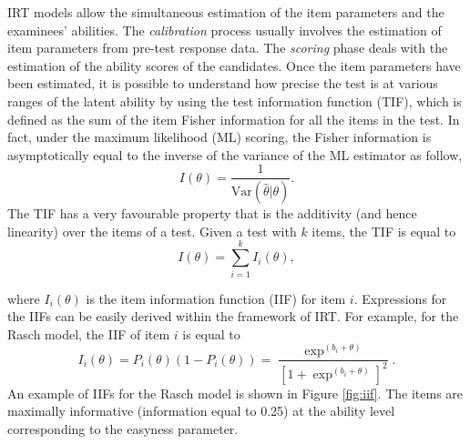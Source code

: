 IRT models allow the simultaneous estimation of the item parameters and the examinees' abilities. The \textit{calibration} process usually involves the estimation of item parameters from pre-test response data. The \textit{scoring} phase deals with the estimation of the ability scores of the candidates. Once the item parameters have been estimated, it is possible to understand how precise the test is at various ranges of the latent ability by using the test information function (TIF), which is defined as the sum of the item Fisher information for all the items in the test. In fact, under the maximum likelihood (ML) scoring, the Fisher information is asymptotically equal to the inverse of the variance of the ML estimator as follow,
\begin{equation}
I(\theta)=\frac{1}{\text{Var}(\hat{\theta}| \theta)}.
\end{equation}
The TIF has a very favourable property that is the additivity (and hence linearity) over the items of a test. Given a test with $k$ items, the TIF is equal to
\begin{equation}
I(\theta)=\sum_{i=1}^k{I_i(\theta)},
\end{equation}

\noindent where $I_i(\theta)$ is the item information function (IIF) for item $i$. Expressions for the IIFs can be easily derived within the framework of IRT. For example, for the Rasch model, the IIF of item $i$ is equal to
\begin{equation}\label{eq:infofun2pl}
I_i(\theta)=P_i(\theta)(1-P_i(\theta))=\frac{\exp^{(b_i+\theta)}}{[1+\exp^{(b_i+\theta)}]^2}.
\end{equation}
An example of IIFs for the Rasch model is shown in Figure \ref{fig:iif}. The items are maximally informative (information equal to 0.25) at the ability level corresponding to the easyness parameter.

